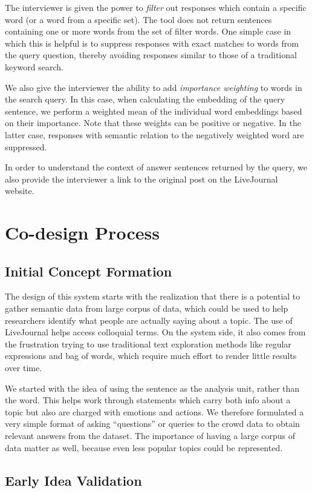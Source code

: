 \documentclass{sigchi}
\begin{document}
The interviewer is given the power to {\em filter} out responses which contain a specific word (or a word from a specific set). The tool does not return sentences containing one or more words from the set of filter words. One simple case in which this is helpful is to suppress responses with exact matches to words from the query question, thereby avoiding responses similar to those of a traditional keyword search.

We also give the interviewer the ability to add {\em importance weighting} to words in the search query. In this case, when calculating the embedding of the query sentence, we perform a weighted mean of the individual word embeddings based on their importance. Note that these weights can be positive or negative. In the latter case, responses with semantic relation to the negatively weighted word are suppressed.

In order to understand the context of answer sentences returned by the query, we also provide the interviewer a link to the original post on the LiveJournal website. 

\section{Co-design Process}
\subsection{Initial Concept Formation}
The design of this system starts with the realization that there is a potential to gather semantic data from large corpus of data, which could be used to help researchers identify what people are actually saying about a topic. The use of LiveJournal helps access colloquial terms. On the system side, it also comes from the frustration trying to use traditional text exploration methods like regular expressions and bag of words, which require much effort to render little results over time.

We started with the idea of using the sentence as the analysis unit, rather than the word. This helps work through statements which carry both info about a topic but also are charged with emotions and actions. We therefore formulated a very simple format of asking ``questions'' or queries to the crowd data to obtain relevant answers from the dataset. The importance of having a large corpus of data matter as well, because even less popular topics could be represented. 

\subsection{Early Idea Validation}
\end{document}
